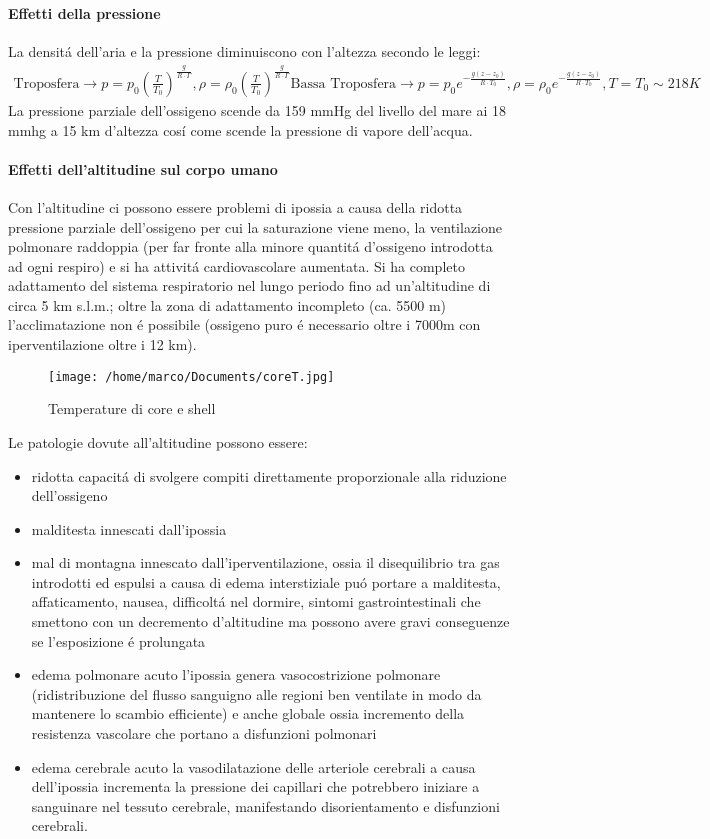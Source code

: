 \documentclass[10pt]{article}
\begin{document}
\paragraph{Effetti della pressione}
La densitá dell'aria e la pressione diminuiscono con l'altezza secondo le leggi:
\begin{align*}
\text{Troposfera} \rightarrow p=p_0 (\frac{T}{T_0})^{\frac{g}{R \cdot \Gamma}},\rho=\rho_0 (\frac{T}{T_0})^{\frac{g}{R \cdot \Gamma}}
\text{Bassa Troposfera} \rightarrow p=p_0 e^{-\frac{g(z-z_0)}{R \cdot T_0}}, \rho=\rho_0 e^{-\frac{g(z-z_0)}{R \cdot T_0}}, T=T_0 \sim{218 K}
\end{align*}
La pressione parziale dell'ossigeno scende da 159 mmHg del livello del mare ai 18 mmhg a 15 km d'altezza cosí come scende la pressione di vapore dell'acqua.

\paragraph{Effetti dell'altitudine sul corpo umano}
Con l'altitudine ci possono essere problemi di ipossia a causa della ridotta pressione parziale dell'ossigeno per cui la saturazione viene meno, la ventilazione polmonare raddoppia (per far fronte alla minore quantitá d'ossigeno introdotta ad ogni respiro) e si ha attivitá cardiovascolare aumentata. Si ha completo adattamento del sistema respiratorio nel lungo periodo fino ad un'altitudine di circa 5 km s.l.m.; oltre la zona di adattamento incompleto (ca. 5500 m) l'acclimatazione non é possibile (ossigeno puro é necessario oltre i 7000m con iperventilazione oltre i 12 km). 
\begin{figure}[h!]
\centering
\texttt{[image: /home/marco/Documents/coreT.jpg]}
\caption{Temperature di core e shell}
\label{fig:coreT}
\end{figure}
Le patologie dovute all'altitudine possono essere:
\begin{itemize}
\item ridotta capacitá di svolgere compiti direttamente proporzionale alla riduzione dell'ossigeno
\item malditesta innescati dall'ipossia
\item mal di montagna innescato dall'iperventilazione, ossia il disequilibrio tra gas introdotti ed espulsi a causa di edema interstiziale \textrightarrow puó portare a malditesta, affaticamento, nausea, difficoltá nel dormire, sintomi gastrointestinali che smettono con un decremento d'altitudine ma possono avere gravi conseguenze se l'esposizione é prolungata
\item edema polmonare acuto \textrightarrow l'ipossia genera vasocostrizione polmonare (ridistribuzione del flusso sanguigno alle regioni ben ventilate in modo da mantenere lo scambio efficiente) e anche globale ossia incremento della resistenza vascolare che portano a disfunzioni polmonari
\item edema cerebrale acuto \textrightarrow la vasodilatazione delle arteriole cerebrali a causa dell'ipossia incrementa la pressione dei capillari che potrebbero iniziare a sanguinare nel tessuto cerebrale, manifestando disorientamento e disfunzioni cerebrali.
\end{itemize}
\end{document}
